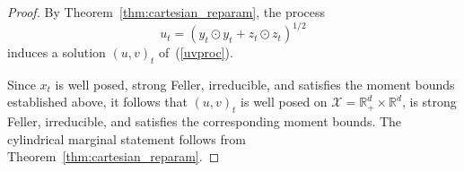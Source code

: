 \documentclass[11pt, twoside]{report}
\begin{document}
\begin{proof}

By Theorem~\ref{thm:cartesian_reparam},
the process
\[
u_t=(y_t\odot y_t+z_t\odot z_t)^{1/2}
\]
induces a solution \((u,v)_t\) of~(\ref{uvproc}).

Since \(x_t\) is well posed, strong Feller, irreducible, and satisfies
the moment bounds established above, it follows that \((u,v)_t\) is
well posed on \(\mathcal X=\mathbb R_+^d\times\mathbb R^d\), is strong
Feller, irreducible, and satisfies the corresponding moment bounds.
The cylindrical marginal statement follows from
Theorem~\ref{thm:cartesian_reparam}.

\end{proof}
\end{document}

